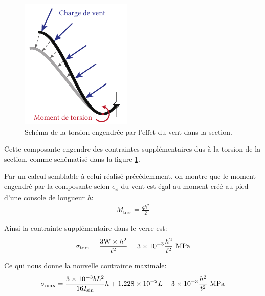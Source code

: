 \documentclass[11pt,titlepage]{article}
\begin{document}
\begin{figure}
\centering
\includegraphics[width=0.8\linewidth]{img/ondul/torsion.pdf}
\caption{Schéma de la torsion engendrée par l'effet du vent dans la section.}
\label{fig:tors_ondul}
\vspace{10pt}
\end{figure}

Cette composante engendre des contraintes supplémentaires dus à la torsion de la section, comme schématisé dans la figure \ref{fig:tors_ondul}.

Par un calcul semblable à celui réalisé précédemment, on montre que le moment engendré par la composante selon $\underline{e_x}$ du vent est égal au moment créé au pied d'une console de longueur $h$:
\begin{align}
    M_{\text{tors}} = \frac{q h^2}{2}
\end{align}

Ainsi la contrainte supplémentaire dans le verre est:
\begin{align}
    \sigma_{\text{tors}} = \frac{3\text{W}\times h^2}{t^2} = \num{3d-3} \frac{h^2}{t^2}\text{ }\unit{\mega\pascal}
\end{align}

Ce qui nous donne la nouvelle contrainte maximale:
\begin{align}
    \sigma_{\text{max}} = \frac{\num{3d-3} b L^2}{16 I_{\text{sin}}}h + \num{1.228d-2} L + \num{3d-3} \frac{h^2}{t^2}\text{ }\unit{\mega\pascal}\label{eq:s_maxondul}
\end{align}
\end{document}
